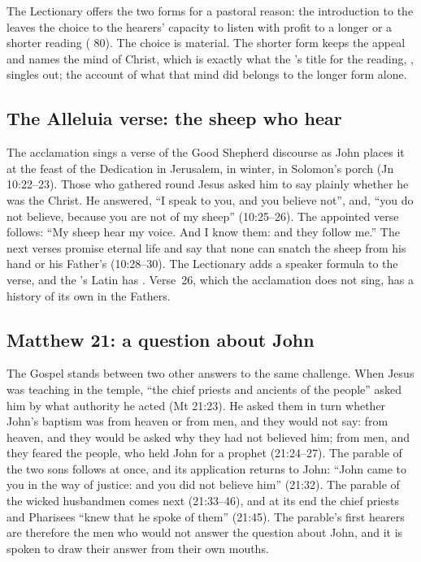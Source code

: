 The Lectionary offers the two forms for a pastoral reason: the introduction to
the  leaves the choice to the hearers' capacity to listen with profit
to a longer or a shorter reading ( 80). The choice is
material. The shorter form keeps the appeal and names the mind of Christ, which
is exactly what the 's title for the reading, , singles out; the account of what that mind did
belongs to the longer form alone.

\subsection{The Alleluia verse: the sheep who hear}

The acclamation sings a verse of the Good Shepherd discourse as John places it
at the feast of the Dedication in Jerusalem, in winter, in Solomon's porch
(Jn 10:22--23). Those who gathered round Jesus asked him to say plainly whether
he was the Christ. He answered, ``I speak to you, and you believe not'', and,
``you do not believe, because you are not of my sheep'' (10:25--26). The
appointed verse follows: ``My sheep hear my voice. And I know them: and they
follow me.'' The next verses promise eternal life and say that none can snatch
the sheep from his hand or his Father's (10:28--30). The Lectionary adds a
speaker formula to the verse, and the 's Latin has . Verse~26, which the
acclamation does not sing, has a history of its own in the Fathers.

\subsection{Matthew 21: a question about John}

The Gospel stands between two other answers to the same challenge. When
Jesus was teaching in the temple, ``the chief priests and ancients of the
people'' asked him by what authority he acted (Mt 21:23). He asked them in
turn whether John's baptism was from heaven or from men, and they would not
say: from heaven, and they would be asked why they had not believed him; from
men, and they feared the people, who held John for a prophet (21:24--27). The
parable of the two sons follows at once, and its application returns to John:
``John came to you in the way of justice: and you did not believe him'' (21:32).
The parable of the wicked husbandmen comes next (21:33--46), and at its end the
chief priests and Pharisees ``knew that he spoke of them'' (21:45). The
parable's first hearers are therefore the men who would not answer the
question about John, and it is spoken to draw their answer from their own
mouths.

